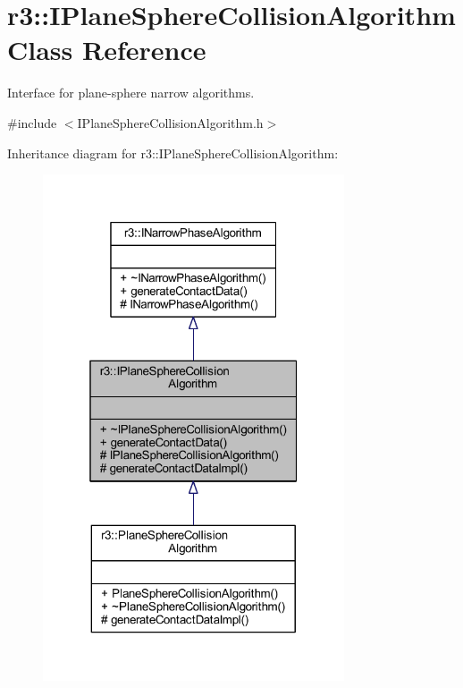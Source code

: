 \hypertarget{classr3_1_1_i_plane_sphere_collision_algorithm}{}\section{r3\+:\+:I\+Plane\+Sphere\+Collision\+Algorithm Class Reference}
\label{classr3_1_1_i_plane_sphere_collision_algorithm}


Interface for plane-\/sphere narrow algorithms.  




{\ttfamily \#include $<$I\+Plane\+Sphere\+Collision\+Algorithm.\+h$>$}



Inheritance diagram for r3\+:\+:I\+Plane\+Sphere\+Collision\+Algorithm\+:\nopagebreak
\begin{figure}[H]
\begin{center}
\leavevmode
\includegraphics[width=253pt]{classr3_1_1_i_plane_sphere_collision_algorithm__inherit__graph}
\end{center}
\end{figure}



